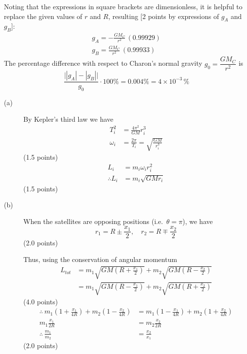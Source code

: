 Noting that the expressions in square brackets are dimensionless, it is
helpful to replace the given values of $r$ and $R$, resulting [2 points by
expressions of $g_A$ and $g_B$]:
\begin{gather*}
g_A = -\frac{GM_C}{r^2}\,(0.99929) \\
g_B = \frac{GM_C}{r^2}\,(0.99933)
\end{gather*}
The percentage difference with respect to Charon's normal gravity
$g_0 = \dfrac{GM_C}{r^2}$ is
\begin{equation*}
\frac{\big||g_A| - |g_B|\big|}{g_0}\cdot 100\% = 0.004\%
  = 4 \times 10^{-3}\,\% \tag*{[1 point]}
\end{equation*}

\begin{description}
\item[(a)] By Kepler's third law we have
  \begin{align*}
    T_i^2 &= \frac{4\pi^2}{GM}r_i^3 \\
    \omega_i &= \frac{2\pi}{T_i} = \sqrt{\frac{GM}{r_i^3}}
  \end{align*}
  \hfill(1.5 points)
  \begin{align*}
    L_i &= m_i\omega_i r_i^2 \\
    \therefore L_i &= m_i\sqrt{GMr_i}
  \end{align*}
  \hfill(1.5 points)

\item[(b)] When the satellites are opposing positions (i.e.\ $\theta = \pi$),
  we have %
  \[
    r_1 = R \pm \frac{x_1}{2}, \quad r_2 = R \mp \frac{x_2}{2}
  \]
  \hfill(2.0 points)

  Thus, using the conservation of angular momentum
  \begin{align*}
    L_{tot} &= m_1\sqrt{GM\left(R + \frac{x_1}{2}\right)}
             + m_2\sqrt{GM\left(R - \frac{x_2}{2}\right)} \\
            &= m_1\sqrt{GM\left(R - \frac{x_1}{2}\right)}
             + m_2\sqrt{GM\left(R + \frac{x_2}{2}\right)}
  \end{align*}
  \hfill(4.0 points)
  \begin{align*}
    \therefore\ m_1\left(1 + \frac{x_1}{4R}\right)
      + m_2\left(1 - \frac{x_2}{4R}\right)
      &= m_1\left(1 - \frac{x_1}{4R}\right)
      + m_2\left(1 + \frac{x_2}{4R}\right) \\
    m_1\frac{x_1}{2R} &= m_2\frac{x_2}{2R} \\
    \therefore\ \frac{m_1}{m_2} &= \frac{x_2}{x_1}
  \end{align*}
  \hfill(2.0 points)


\end{description}
